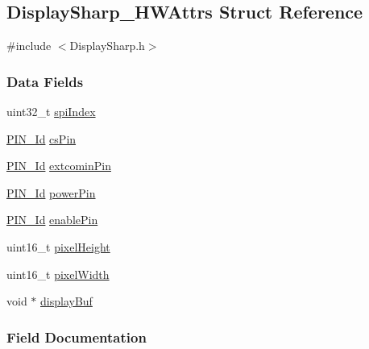 \subsection{Display\+Sharp\+\_\+\+H\+W\+Attrs Struct Reference}
\label{struct_display_sharp___h_w_attrs}


{\ttfamily \#include $<$Display\+Sharp.\+h$>$}

\subsubsection*{Data Fields}
\begin{DoxyCompactItemize}
\item 
uint32\+\_\+t \hyperlink{struct_display_sharp___h_w_attrs_af83c34511a66ee21087eb8d167cd0c70}{spi\+Index}
\item 
\hyperlink{_p_i_n_8h_a9ae8197f460bb76ea09a84f47d09921f}{P\+I\+N\+\_\+\+Id} \hyperlink{struct_display_sharp___h_w_attrs_a510f3e4ea7cafeb29c2240212bcda6df}{cs\+Pin}
\item 
\hyperlink{_p_i_n_8h_a9ae8197f460bb76ea09a84f47d09921f}{P\+I\+N\+\_\+\+Id} \hyperlink{struct_display_sharp___h_w_attrs_abc0592bd3bc8efac92079a280cf038d9}{extcomin\+Pin}
\item 
\hyperlink{_p_i_n_8h_a9ae8197f460bb76ea09a84f47d09921f}{P\+I\+N\+\_\+\+Id} \hyperlink{struct_display_sharp___h_w_attrs_a4cbe1678145e2c2375b0359ed73b1958}{power\+Pin}
\item 
\hyperlink{_p_i_n_8h_a9ae8197f460bb76ea09a84f47d09921f}{P\+I\+N\+\_\+\+Id} \hyperlink{struct_display_sharp___h_w_attrs_a6b584654a554c26d587adb647345ec36}{enable\+Pin}
\item 
uint16\+\_\+t \hyperlink{struct_display_sharp___h_w_attrs_a62f62ec53b15da11004d6353721b257c}{pixel\+Height}
\item 
uint16\+\_\+t \hyperlink{struct_display_sharp___h_w_attrs_a3ebb52ba808d5698e368af3e5374494d}{pixel\+Width}
\item 
void $\ast$ \hyperlink{struct_display_sharp___h_w_attrs_a6b1656090f48ee01013d9b0e99d5c03d}{display\+Buf}
\end{DoxyCompactItemize}


\subsubsection{Field Documentation}
